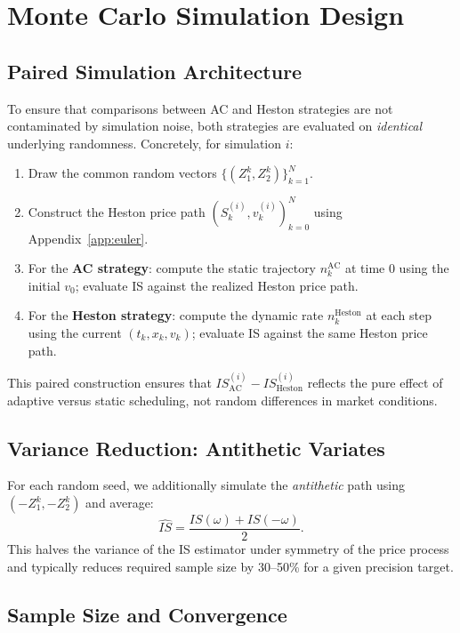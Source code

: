 \documentclass[11pt]{article}
\begin{document}
\section{Monte Carlo Simulation Design}
\label{app:montecarlo}

\subsection{Paired Simulation Architecture}

To ensure that comparisons between AC and Heston strategies are not contaminated by simulation noise, both strategies are evaluated on \emph{identical} underlying randomness. Concretely, for simulation $i$:
\begin{enumerate}[label=(\roman*)]
\item Draw the common random vectors $\{(Z_1^k, Z_2^k)\}_{k=1}^N$.
\item Construct the Heston price path $(S_k^{(i)}, v_k^{(i)})_{k=0}^N$ using Appendix~\ref{app:euler}.
\item For the \textbf{AC strategy}: compute the static trajectory $n_k^{\text{AC}}$ at time $0$ using the initial $v_0$; evaluate IS against the realized Heston price path.
\item For the \textbf{Heston strategy}: compute the dynamic rate $n_k^{\text{Heston}}$ at each step using the current $(t_k, x_k, v_k)$; evaluate IS against the same Heston price path.
\end{enumerate}

This paired construction ensures that $IS_{\text{AC}}^{(i)} - IS_{\text{Heston}}^{(i)}$ reflects the pure effect of adaptive versus static scheduling, not random differences in market conditions.

\subsection{Variance Reduction: Antithetic Variates}

For each random seed, we additionally simulate the \emph{antithetic} path using $(-Z_1^k, -Z_2^k)$ \cite{glasserman2004monte} and average:
\[
\widehat{IS} = \frac{IS(\omega) + IS(-\omega)}{2}.
\]
This halves the variance of the IS estimator under symmetry of the price process and typically reduces required sample size by 30--50\% for a given precision target.

\subsection{Sample Size and Convergence}
\end{document}
